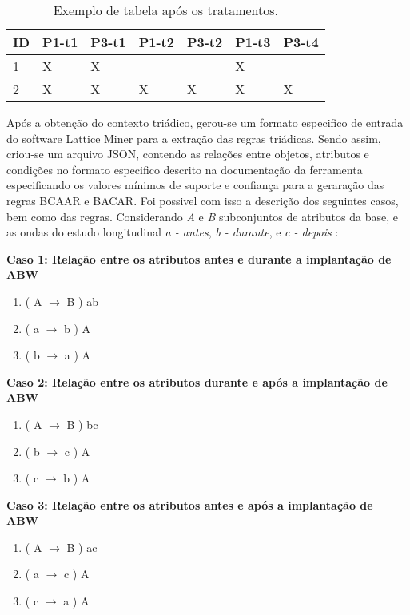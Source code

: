 \documentclass[kdmile,a4paper]{kdmile} %
\begin{document}
\begin{table}[h!]
\centering
\begin{tabular}{ p{1cm}p{1cm}p{1cm}p{1cm}p{1cm}p{1cm}p{1cm}  }
 \hline
 \footnotesize{ID}& 
 \footnotesize{P1-t1}&
 \footnotesize{P3-t1}&
 \footnotesize{P1-t2}&
  \footnotesize{P3-t2}&
  \footnotesize{P1-t3}&
  \footnotesize{P3-t4}
 \\
\hline
\footnotesize{1}& 
\footnotesize{X}&
\footnotesize{X}&
\footnotesize{ }&
\footnotesize{ }&
\footnotesize{X}&
\footnotesize{ }
\\
\footnotesize{2}& 
\footnotesize{X}&
\footnotesize{X}&
\footnotesize{X}&
\footnotesize{X}&
\footnotesize{X}&
\footnotesize{X}
\\
\hline
\end{tabular}
\caption{Exemplo de tabela após os tratamentos.}
\label{table:Table II}
\end{table}

Após a obtenção do contexto triádico, gerou-se um formato especifico de entrada do software Lattice Miner para a extração das regras triádicas. Sendo assim, criou-se um arquivo JSON, contendo as relações entre objetos, atributos e condições no formato especifico descrito na documentação da ferramenta especificando os valores mínimos de suporte e confiança para a geraração das regras BCAAR e BACAR. Foi possivel com isso a descrição dos seguintes casos, bem como das  regras. Considerando  \textit{A} e \textit{B} subconjuntos de atributos da base, e as ondas do estudo longitudinal \textit{a - antes}, \textit{b - durante}, e \textit{c - depois} :\newline



\textbf{Caso 1: Relação entre os atributos antes e durante a implantação de ABW} 
\begin{enumerate}
\item ( A $\rightarrow$ B ) ab
\item ( a $\rightarrow$ b ) A
\item ( b $\rightarrow$ a ) A
\end{enumerate}
\textbf{Caso 2: Relação entre os atributos durante e após a implantação de ABW} 
\begin{enumerate}
\item ( A $\rightarrow$ B ) bc
\item ( b $\rightarrow$ c ) A
\item ( c $\rightarrow$ b ) A
\end{enumerate}
\textbf{Caso 3: Relação entre os atributos antes e após a implantação de ABW} 
\begin{enumerate}
\item ( A $\rightarrow$ B ) ac
\item ( a $\rightarrow$ c ) A
\item ( c $\rightarrow$ a ) A
\end{enumerate}
\end{document}
